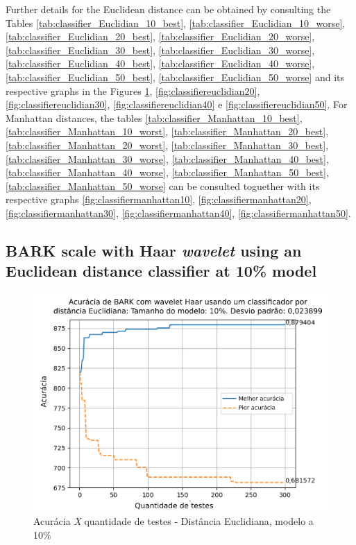 \par Further details for the Euclidean distance can be obtained by consulting the Tables
 \ref{tab:classifier_Euclidian_10_best}, \ref{tab:classifier_Euclidian_10_worse},
\ref{tab:classifier_Euclidian_20_best}, \ref{tab:classifier_Euclidian_20_worse}, 
\ref{tab:classifier_Euclidian_30_best}, \ref{tab:classifier_Euclidian_30_worse}, 
\ref{tab:classifier_Euclidian_40_best}, \ref{tab:classifier_Euclidian_40_worse}, 
\ref{tab:classifier_Euclidian_50_best}, \ref{tab:classifier_Euclidian_50_worse}
and its respective graphs in the Figures \ref{fig:classifiereuclidian10}, \ref{fig:classifiereuclidian20}, \ref{fig:classifiereuclidian30}, \ref{fig:classifiereuclidian40} e \ref{fig:classifiereuclidian50}. For Manhattan distances, the tables \ref{tab:classifier_Manhattan_10_best}, \ref{tab:classifier_Manhattan_10_worst}, 
\ref{tab:classifier_Manhattan_20_best}, \ref{tab:classifier_Manhattan_20_worst}, 
\ref{tab:classifier_Manhattan_30_best}, \ref{tab:classifier_Manhattan_30_worse}, 
\ref{tab:classifier_Manhattan_40_best}, \ref{tab:classifier_Manhattan_40_worse}, 
\ref{tab:classifier_Manhattan_50_best}, \ref{tab:classifier_Manhattan_50_worse} 
can be consulted toguether with its respective graphs \ref{fig:classifiermanhattan10}, \ref{fig:classifiermanhattan20}, \ref{fig:classifiermanhattan30}, \ref{fig:classifiermanhattan40}, \ref{fig:classifiermanhattan50}.\\



\newpage
\subsection{BARK scale with Haar \textit{wavelet} using an Euclidean distance classifier at 10\% model}



\begin{figure}[!h]
	\centering
	\includegraphics[width=\linewidth]{images/results/confusionMatrices/classifier_Euclidian_10}
	\caption{Acurácia \textit{X} quantidade de testes - Distância Euclidiana, modelo a 10\%}
	\label{fig:classifiereuclidian10}
\end{figure}

